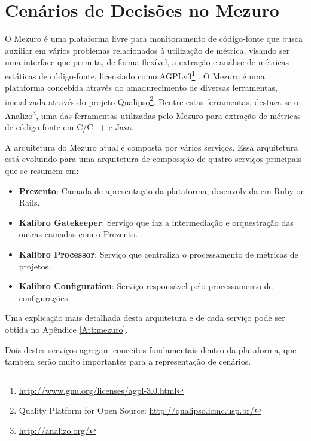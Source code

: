 \section{Cenários de Decisões no Mezuro}
\label{mezuro-cenarios}

O Mezuro é uma plataforma livre para monitoramento de código-fonte que busca auxiliar em vários problemas relacionados à utilização de métrica, visando ser uma interface que permita, de forma flexível, a extração e análise de métricas estáticas de código-fonte, licensiado como AGPLv3\footnote{\url{http://www.gnu.org/licenses/agpl-3.0.html}} \cite{manzo2014}. O Mezuro é uma plataforma concebida através do amadurecimento de diversas ferramentas, inicializada através do projeto Qualipso\footnote{Quality Platform for Open Source: \url{http://qualipso.icmc.usp.br/}}. Dentre estas ferramentas, destaca-se o Analizo\footnote{\url{http://analizo.org/}}, uma das ferramentas utilizadas pelo Mezuro para extração de métricas de código-fonte em C/C++ e Java.

A arquitetura do Mezuro atual é composta por vários serviços. Essa arquitetura está evoluindo para uma arquitetura de composição de quatro serviços principais que se resumem em:

\begin{itemize}
\item \textbf{Prezento}: Camada de apresentação da plataforma, desenvolvida em Ruby on Rails.

\item \textbf{Kalibro Gatekeeper}: Serviço que faz a intermediação e orquestração das outras camadas com o Prezento.

\item \textbf{Kalibro Processor}: Serviço que centraliza o processamento de métricas de projetos.

\item \textbf{Kalibro Configuration}: Serviço responsável pelo processamento de configurações.
\end{itemize}

Uma explicação mais detalhada desta arquitetura e de cada serviço pode ser obtida no Apêndice \ref{Att:mezuro}.

Dois destes serviços agregam conceitos fundamentais dentro da plataforma, que também serão muito importantes para a representação de cenários. 

